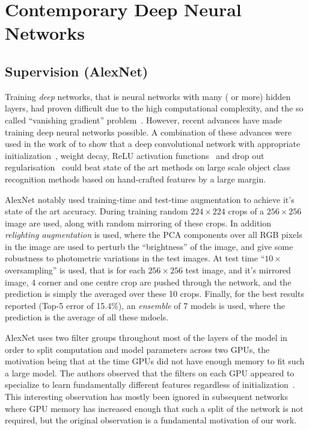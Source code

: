 \documentclass[thesis]{subfiles}
\begin{document}
\section{Contemporary Deep Neural Networks}

\subsection{Supervision (AlexNet)}
Training \emph{deep} networks, that is neural networks with many ( or more) hidden layers, had proven difficult due to the high computational complexity, and the so called ``vanishing gradient'' problem~\citep{bengio:ieeenn94}. However, recent advances have made training deep neural networks possible. A combination of these advances were used in the work of \citet{Krizhevsky2012imanet} to show that a deep convolutional network with appropriate initialization~\citep{Sutskever2013momentum}, weight decay, ReLU activation functions~\citep{conf/icml/NairH10} and drop out regularisation~\citep{1207.0580v1} could beat state of the art methods on large scale object class recognition methods based on hand-crafted features by a large margin. 

AlexNet notably used training-time and test-time augmentation to achieve it's state of the art accuracy. During training random $224 \times 224$ crops of a $256 \times 256$ image are used, along with random mirroring of these crops. In addition \emph{relighting augmentation} is used, where the PCA components over all RGB pixels in the image are used to perturb the ``brightness'' of the image, and give some robustness to photometric variations in the test images. At test time ``$10\times$ oversampling'' is used, that is for each $256\times 256$ test image, and it's mirrored image, 4 corner and one centre crop are pushed through the network, and the prediction is simply the averaged over these 10 crops. Finally, for the best results reported (Top-5 error of 15.4\%), an \emph{ensemble} of 7 models is used, where the prediction is the average of all these mdoels. 

AlexNet uses two filter groups throughout most of the layers of the model in order to split computation and model parameters across two GPUs, the motivation being that at the time GPUs did not have enough memory to fit such a large model. The authors observed that the filters on each GPU appeared to specialize to learn fundamentally different features regardless of initialization~\citep{Krizhevsky2012imanet}. This interesting observation has mostly been ignored in subsequent networks where GPU memory has increased enough that such a split of the network is not required, but the original observation is a fundamental motivation of our work.
\end{document}

